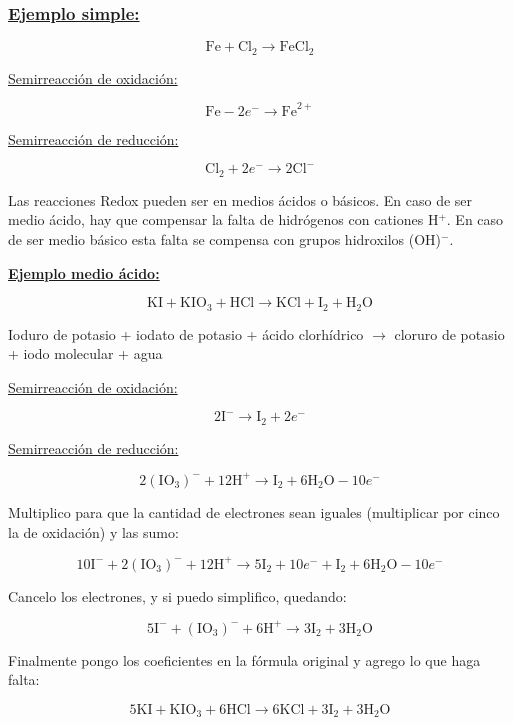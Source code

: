 \subsubsection*{\underline{Ejemplo simple:}}

$$\text{Fe} + \text{Cl}_2 \longrightarrow \text{FeCl}_2$$

\begin{multicols}{2}

\underline{Semirreacción de oxidación:}

$$\text{Fe} - 2e^- \longrightarrow \text{Fe}^{2+}$$

\underline{Semirreacción de reducción:}

$$\text{Cl}_2 + 2e^- \longrightarrow 2\text{Cl}^{-} $$

\end{multicols}

Las reacciones Redox pueden ser en medios ácidos o básicos. En caso de ser medio ácido, hay que compensar la falta de hidrógenos con cationes H$^+$. En caso de ser medio básico esta falta se compensa con grupos hidroxilos (OH)$^-$.


\skipline
\textbf{\underline{Ejemplo medio ácido:}}

$$\text{KI} + \text{K} \text{I} \text{O}_3 + \text{H} \text{Cl} \longrightarrow
\text{KCl} + \text{I}_2 +  \text{H}_2 \text{O}$$

\hfil Ioduro de potasio \hfil + \hfil iodato de potasio \hfil + \hfil ácido clorhídrico \hfil
$\rightarrow$ \hfil
cloruro de potasio \hfil + \hfil iodo molecular \hfil + \hfil agua \hfil 

\begin{multicols}{2}

\underline{Semirreacción de oxidación:}

$$2\text{I}^{-} \longrightarrow \text{I}_2 + 2e^-$$

\underline{Semirreacción de reducción:}

$$2(\text{IO}_3)^{-} + 12 \text{H}^+ \longrightarrow \text{I}_2 + 6\text{H}_2 \text{O} - 10e^-$$
\end{multicols}

Multiplico para que la cantidad de electrones sean iguales (multiplicar por cinco la de oxidación) y las sumo:

$$10\text{I}^{-} + 2(\text{IO}_3)^{-} + 12 \text{H}^+ \longrightarrow 5 \text{I}_2 + 10 e^- + \text{I}_2 + 6\text{H}_2 \text{O} - 10e^-$$

Cancelo los electrones, y si puedo simplifico, quedando:

$$5\text{I}^{-} + (\text{IO}_3)^{-} + 6 \text{H}^+ \longrightarrow 3 \text{I}_2 + 3\text{H}_2 \text{O}$$

Finalmente pongo los coeficientes en la fórmula original y agrego lo que haga falta:

$$5\text{KI} + \text{K} \text{I} \text{O}_3 + 6\text{H} \text{Cl} \longrightarrow
6\text{KCl} + 3\text{I}_2 +  3\text{H}_2 \text{O}$$


